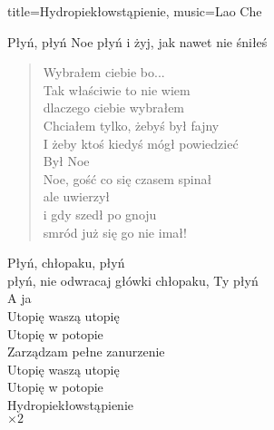 \begin{song}{title={Hydropiekłowstąpienie}, music={Lao Che}}
\begin{multicols}{2}
\begin{interlude}
        Płyń, płyń Noe płyń i żyj, jak nawet nie śniłeś \\
    \end{interlude}
    \begin{verse}
        Wybrałem ciebie bo... \\
        Tak właściwie to nie wiem \\ 
        dlaczego ciebie wybrałem \\
        Chciałem tylko, żebyś był fajny \\
        I żeby ktoś kiedyś mógł powiedzieć \\
        Był Noe \\
        Noe, gość co się czasem spinał \\
        ale uwierzył \\
        i gdy szedł po gnoju \\
        smród już się go nie imał! \\
    \end{verse}
    \begin{chorus}
        Płyń, chłopaku, płyń \\
        płyń, nie odwracaj główki
        chłopaku, Ty płyń \\
        A ja \\
        Utopię waszą utopię \\
        Utopię w potopie \\
        Zarządzam pełne zanurzenie \\
        Utopię waszą utopię \\
        Utopię w potopie \\
        Hydropiekłowstąpienie \\
            $\times 2$
    \end{chorus}    
\end{multicols}
\end{song}

